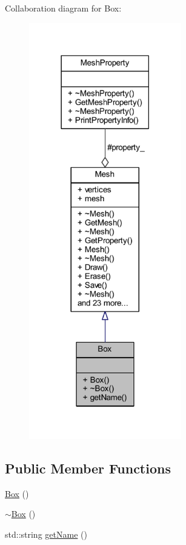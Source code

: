 Collaboration diagram for Box\+:
\nopagebreak
\begin{figure}[H]
\begin{center}
\leavevmode
\includegraphics[width=188pt]{class_box__coll__graph}
\end{center}
\end{figure}
\subsection*{Public Member Functions}
\begin{DoxyCompactItemize}
\item 
\mbox{\hyperlink{class_box_aca78d7db44972bfa78d46b7bbc8796f6}{Box}} ()
\item 
\mbox{\hyperlink{class_box_a6a5e09398e85d602a046b429062fb9c2}{$\sim$\+Box}} ()
\item 
std\+::string \mbox{\hyperlink{class_box_ac8792393d053c6cac65a36e5c1f27f15}{get\+Name}} ()
\end{DoxyCompactItemize}
